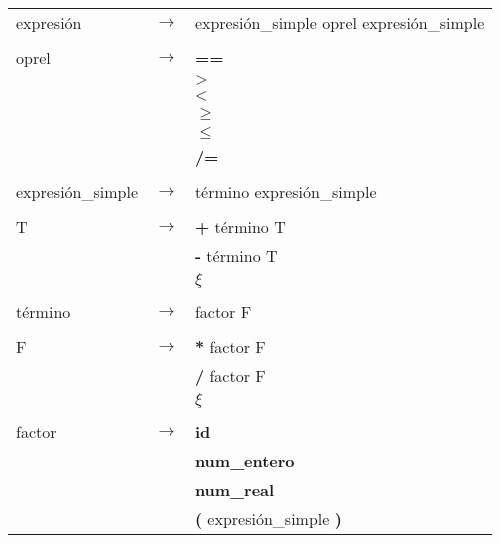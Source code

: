 \documentclass{article}
\begin{document}
\begin{tabular}{l c l}
expresi\'{o}n &  $ \rightarrow $  & expresi\'{o}n\_simple oprel expresi\'{o}n\_simple \\
\\

oprel &  $ \rightarrow $ & \textbf{==} \\
				  & & $ \textbf{>} $ \\
				  & & $ \textbf{<} $ \\
				  & & \textbf{$ \geq $} \\ 
				  & & \textbf{$ \leq $}\\
				  & & \textbf{/=} \\
\\

expresi\'{o}n\_simple & $ \rightarrow $ & t\'{e}rmino expresi\'{o}n\_simple \\
\\

T &  $ \rightarrow $ & \textbf{+} t\'{e}rmino T \\
                  & & \textbf{-} t\'{e}rmino T \\
                  & &  $ \xi $ \\
\\

t\'{e}rmino & $ \rightarrow $ & factor F \\
\\

F & $ \rightarrow $ & \textbf{*} factor F \\
                  & & \textbf{/} factor F \\
                  & & $ \xi $ \\
\\

factor & $ \rightarrow $ & \textbf{id} \\
                    & & \textbf{num\_entero} \\
                    & & \textbf{num\_real} \\
                    & & \textbf{(} expresi\'{o}n\_simple \textbf{)}
\end{tabular}
\end{document}
